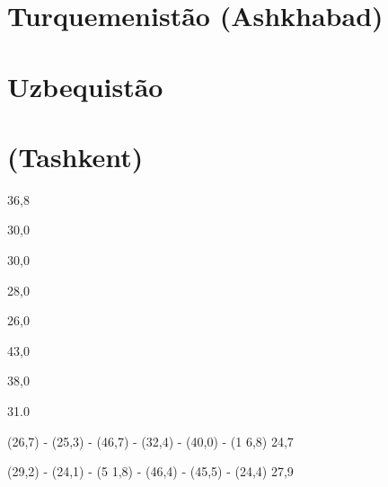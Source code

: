 {{{\section{Turquemenistão (Ashkhabad)}
 \par 
\section{Uzbequistão}
 \par 
\section{(Tashkent)}
 \par 
36,8
 \par 
30,0
 \par 
30,0
 \par 
28,0
 \par 
26,0
 \par 
43,0
 \par 
38,0
 \par 
31.{\color{blue}0}
 \par 
(26,7) - (25,3) - (46,7) - (32,4) - (40,0) - (1 6,8) 24,7
 \par 
(29,2) - (24,1) - (5 1,8) - (46,4) - (45,5) - (24,4) 27,9
 \par 
}}}
